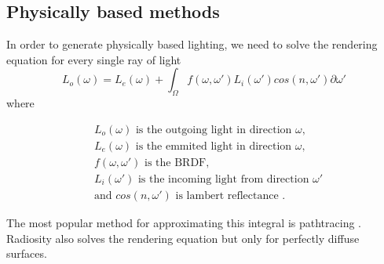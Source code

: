 \documentclass{ACGSeminar}
\begin{document}
	\subsection{Physically based methods}
	In order to generate physically based lighting, we need to solve the rendering equation for every single ray of light
	$$ L_o(\omega) = L_e(\omega) + \int_\Omega f(\omega, \omega')L_i(\omega')cos(n, \omega') \partial \omega' $$
	where %
	\begin{center}
		\begin{align*}
			&L_o(\omega) \text{ is the outgoing light in direction } \omega\text{,}\\
			&L_e(\omega) \text{ is the emmited light in direction } \omega\text{,}\\
			&f(\omega, \omega') \text{ is the BRDF} \text{,}\\
			&L_i(\omega') \text{ is the incoming light from direction } \omega'\\
			&\text{and } cos(n, \omega') \text{ is lambert reflectance}  \text{ .}
		\end{align*}
	\end{center}
	The most popular method for approximating this integral is pathtracing \cite{P2PATH}. Radiosity also solves the rendering equation but only for perfectly diffuse surfaces.

\end{document}
